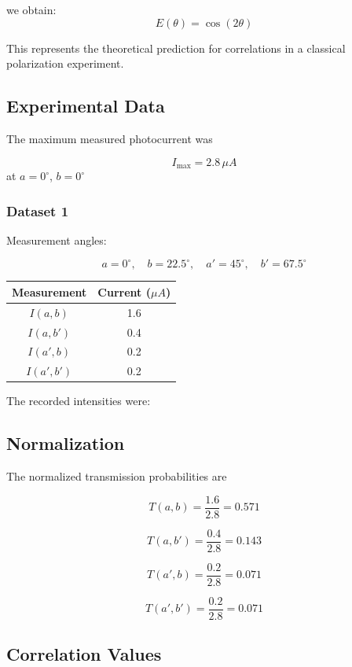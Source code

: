 \documentclass[14pt,a4paper]{extarticle}
\begin{document}
we obtain:
\begin{equation}
E(\theta) = \cos(2\theta)
\end{equation}

This represents the theoretical prediction for correlations in a classical polarization experiment.

\subsection{Experimental Data}

The maximum measured photocurrent was

\[
I_{\text{max}} = 2.8\,\mu A
\]
at $a = 0^\circ$, $b = 0^\circ$

\subsubsection {Dataset 1}

Measurement angles:

\[
a = 0^\circ, \quad b = 22.5^\circ, \quad a' = 45^\circ, \quad b' = 67.5^\circ
\]

\begin{table}[h]
\centering
\begin{tabular}{c c}
Measurement & Current ($\mu A$) \\
\hline
$I(a,b)$ & 1.6 \\
$I(a,b')$ & 0.4 \\
$I(a',b)$ & 0.2 \\
$I(a',b')$ & 0.2 \\
\end{tabular}
\end{table}

The recorded intensities were:

\subsection {Normalization}

The normalized transmission probabilities are

\[
T(a,b) = \frac{1.6}{2.8} = 0.571
\]

\[
T(a,b') = \frac{0.4}{2.8} = 0.143
\]

\[
T(a',b) = \frac{0.2}{2.8} = 0.071
\]

\[
T(a',b') = \frac{0.2}{2.8} = 0.071
\]

\subsection {Correlation Values}
\end{document}
